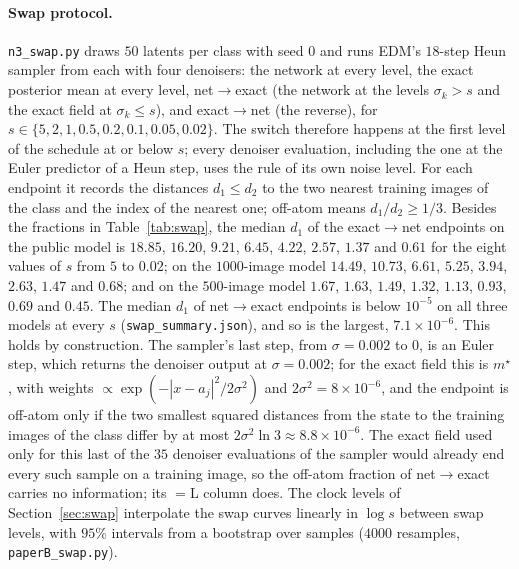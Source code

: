 \documentclass{article} %
\theoremstyle{plain}
\theoremstyle{definition}
\theoremstyle{remark}
\begin{document}
\paragraph{Swap protocol.} \texttt{n3\_swap.py} draws $50$ latents per class with seed $0$ and runs
EDM's $18$-step Heun sampler from each with four denoisers: the network at every level, the exact
posterior mean at every level, net$\to$exact (the network at the levels $\sigma_k>s$ and the exact
field at $\sigma_k\le s$), and exact$\to$net (the reverse), for
$s\in\{5,2,1,0.5,0.2,0.1,0.05,0.02\}$. The switch therefore happens at the first level of the
schedule at or below $s$; every denoiser evaluation, including the one at the Euler predictor of a
Heun step, uses the rule of its own noise level. For each endpoint it records the distances $d_1\le d_2$ to the two nearest training images
of the class and the index of the nearest one; off-atom means $d_1/d_2\ge1/3$. Besides the
fractions in Table~\ref{tab:swap}, the median $d_1$ of the exact$\to$net endpoints on the public
model is $18.85$, $16.20$, $9.21$, $6.45$, $4.22$, $2.57$, $1.37$ and $0.61$ for the eight values
of $s$ from $5$ to $0.02$; on the $1000$-image model $14.49$, $10.73$, $6.61$, $5.25$, $3.94$,
$2.63$, $1.47$ and $0.68$; and on the $500$-image model $1.67$, $1.63$, $1.49$, $1.32$, $1.13$,
$0.93$, $0.69$ and $0.45$. The median $d_1$ of net$\to$exact endpoints is below $10^{-5}$ on all
three models at every $s$ (\texttt{swap\_summary.json}), and so is the largest, $7.1\times10^{-6}$.
This holds by construction. The sampler's last step, from $\sigma=0.002$ to $0$, is an Euler step,
which returns the denoiser output at $\sigma=0.002$; for the exact field this is $m^\star$, with
weights $\propto\exp(-|x-a_j|^2/2\sigma^2)$ and $2\sigma^2=8\times10^{-6}$, and the endpoint is
off-atom only if the two smallest squared distances from the state to the training images of the
class differ by at most $2\sigma^2\ln3\approx8.8\times10^{-6}$. The exact field used only for this
last of the $35$ denoiser evaluations of the sampler would already end every such sample on a
training image, so the off-atom fraction of net$\to$exact carries no information; its $=$L column
does. The clock levels of Section~\ref{sec:swap} interpolate the swap curves linearly in $\log s$
between swap levels, with $95\%$ intervals from a bootstrap over samples ($4000$ resamples,
\texttt{paperB\_swap.py}).
\end{document}
